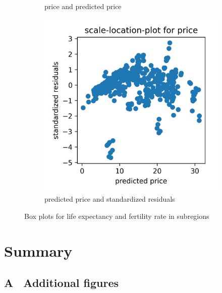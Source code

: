 \documentclass[12 pt]{scrartcl}
\begin{document}
\begin{figure}[htb]
\begin{subfigure}[b]{0.33\textwidth}
    \caption{price and predicted price}
    \label{fig:qqplotyyhatprice}
  \end{subfigure}
  \begin{subfigure}[b]{0.33\textwidth}
    \centering
    \includegraphics[width=\textwidth]{./images/scalelocationplot_price.png}
    \caption{predicted price and standardized residuals}
    \label{fig:scalelocationplotprice}
  \end{subfigure}






  \caption{Box plots for life expectancy and fertility rate in subregions}
  \label{fig:boxplots}
\end{figure}



\section{Summary}


\newpage
{}
\renewcommand\refname{Bibliography}


\newpage
\appendix
{}
\subsection*{A \ Additional figures}
\end{document}
